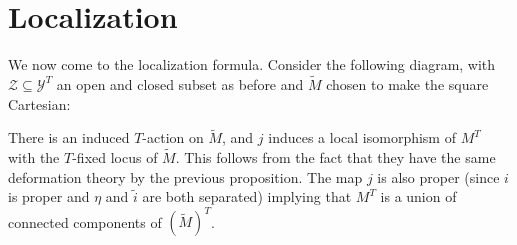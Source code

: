 \section{Localization}\label{rl-0015}

We now come to the localization formula. Consider the following diagram, with \(\mathcal Z\subseteq \mathcal Y^T\) an open and closed subset as before and \(\widetilde M\) chosen to make the square Cartesian:

\begin{center}
\end{center}
There is an induced \(T\)-action on \(\widetilde{M}\), and \(j\) induces a local isomorphism of \(M^T\) with the \(T\)-fixed locus of \(\widetilde{M}\). This follows from the fact that they have the same deformation theory by the previous proposition. The map \(j\) is also proper (since \(i\) is proper and \(\eta\) and \(\tilde i\) are both separated) implying that \(M^T\) is a union of connected components of \((\widetilde{M})^T\).




